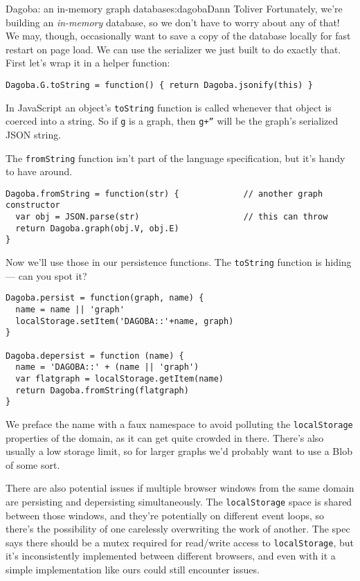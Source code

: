 \begin{aosachapter}{Dagoba: an in-memory graph database}{s:dagoba}{Dann Toliver}
Fortunately, we're building an \emph{in-memory} database, so we don't
have to worry about any of that! We may, though, occasionally want to
save a copy of the database locally for fast restart on page load. We
can use the serializer we just built to do exactly that. First let's
wrap it in a helper function:

\begin{verbatim}
Dagoba.G.toString = function() { return Dagoba.jsonify(this) }
\end{verbatim}

In JavaScript an object's \texttt{toString} function is called whenever
that object is coerced into a string. So if \texttt{g} is a graph, then
\texttt{g+''} will be the graph's serialized JSON string.

The \texttt{fromString} function isn't part of the language
specification, but it's handy to have around.

\begin{verbatim}
Dagoba.fromString = function(str) {             // another graph constructor
  var obj = JSON.parse(str)                     // this can throw
  return Dagoba.graph(obj.V, obj.E)
}
\end{verbatim}

Now we'll use those in our persistence functions. The \texttt{toString}
function is hiding --- can you spot it?

\begin{verbatim}
Dagoba.persist = function(graph, name) {
  name = name || 'graph'
  localStorage.setItem('DAGOBA::'+name, graph)
}

Dagoba.depersist = function (name) {
  name = 'DAGOBA::' + (name || 'graph')
  var flatgraph = localStorage.getItem(name)
  return Dagoba.fromString(flatgraph)
}
\end{verbatim}

We preface the name with a faux namespace to avoid polluting the
\texttt{localStorage} properties of the domain, as it can get quite
crowded in there. There's also usually a low storage limit, so for
larger graphs we'd probably want to use a Blob of some sort.

There are also potential issues if multiple browser windows from the
same domain are persisting and depersisting simultaneously. The
\texttt{localStorage} space is shared between those windows, and they're
potentially on different event loops, so there's the possibility of one
carelessly overwriting the work of another. The spec says there should
be a mutex required for read/write access to \texttt{localStorage}, but
it's inconsistently implemented between different browsers, and even
with it a simple implementation like ours could still encounter issues.


\end{aosachapter}
